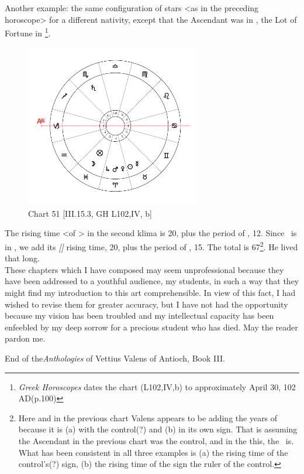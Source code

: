 \newpage
Another example: the same configuration of stars <as in the preceding horoscope> for a different nativity, except that the Ascendant was in \Capricorn, the Lot of Fortune in \Pisces
\footnote{\textit{Greek Horoscopes} dates the chart (L102,IV,b) to approximately April 30, 102 AD(p.100)}.

\clearpage
\begin{figure}
\centering
\vspace{-28pt}
\includegraphics[width=0.68\textwidth]{charts/3_15_3}
\caption{Chart 51 [III.15.3, GH L102,IV, b]}
\label{fig:chart51}
\end{figure} 

The rising time <of \Pisces> in the second klima is 20, plus the period of \Jupiter, 12. Since \Jupiter\, is in \Aries, we add its \textsl{[\Aries]} rising time, 20, plus the period of \Mars, 15. The total is 67\footnote{Here and in the previous chart Valens appears to be adding the years of \Mars\, because it is (a) with the control(?) and (b) in its own sign. That is assuming the Ascendant in the previous chart was the control, and in the this, the \Moon\, is. What has been consistent in all three examples is (a) the rising time of the control's(?) sign, (b) the rising time of the sign the ruler of the control.}. He lived that long. \\
\newline
\newline
These chapters which I have composed may seem unprofessional because they have been addressed to a youthful audience, my students, in such a way that they might find my introduction to this art comprehensible. In view of this fact, I had wished to revise them for greater accuracy, but I have not had the opportunity because my vision has been troubled and my intellectual capacity has been enfeebled by my deep sorrow for a precious student who has died. May the reader pardon me.

End of the\textit{Anthologies} of Vettius Valens of Antioch, Book III.

\newpage